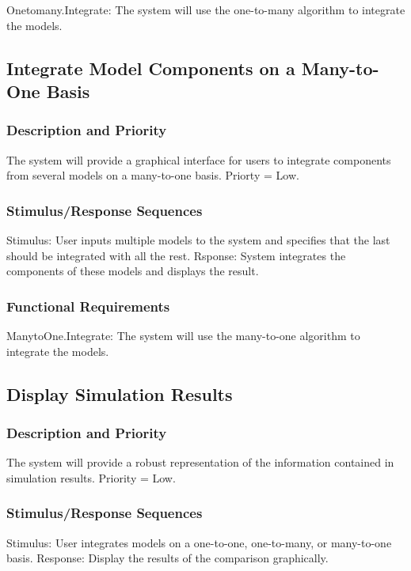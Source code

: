 \documentclass{article}
\begin{document}
Onetomany.Integrate: The system will use the one-to-many algorithm to integrate the models.

\subsection{Integrate Model Components on a Many-to-One Basis}
\subsubsection{Description and Priority}
The system will provide a graphical interface for users to integrate components from several models on a many-to-one basis.  Priorty = Low.

\subsubsection{Stimulus/Response Sequences}

Stimulus: User inputs multiple models to the system and specifies that the last should be integrated with all the rest.
Rsponse: System integrates the components of these models and displays the result.

\subsubsection{Functional Requirements}

ManytoOne.Integrate: The system will use the many-to-one algorithm to integrate the models.

\subsection{Display Simulation Results}

\subsubsection{Description and Priority}
The system will provide a robust representation of the information contained in simulation results.  Priority = Low.

\subsubsection{Stimulus/Response Sequences}

Stimulus: User integrates models on a one-to-one, one-to-many, or many-to-one basis.
Response: Display the results of the comparison graphically.
\end{document}
